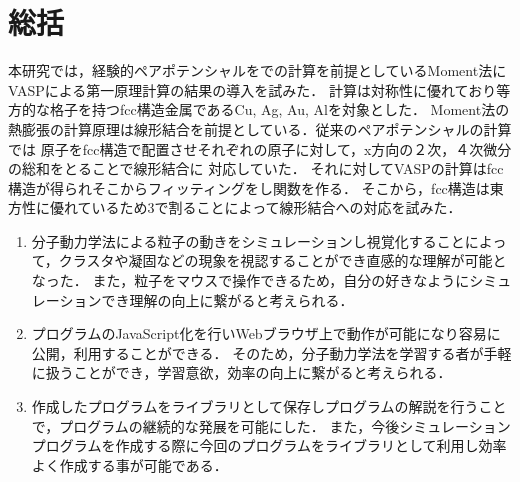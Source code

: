 \chapter{総括}
本研究では，経験的ペアポテンシャルをでの計算を前提としているMoment法にVASPによる第一原理計算の結果の導入を試みた．
計算は対称性に優れており等方的な格子を持つfcc構造金属であるCu, Ag, Au, Alを対象とした．
Moment法の熱膨張の計算原理は線形結合を前提としている．従来のペアポテンシャルの計算では
原子をfcc構造で配置させそれぞれの原子に対して，x方向の２次，４次微分の総和をとることで線形結合に
対応していた．
それに対してVASPの計算はfcc構造が得られそこからフィッティングをし関数を作る．
そこから，fcc構造は東方性に優れているため3で割ることによって線形結合への対応を試みた．





\begin{enumerate}
  \item 分子動力学法による粒子の動きをシミュレーションし視覚化することによって，クラスタや凝固などの現象を視認することができ直感的な理解が可能となった．
また，粒子をマウスで操作できるため，自分の好きなようにシミュレーションでき理解の向上に繋がると考えられる．
  \item プログラムのJavaScript化を行いWebブラウザ上で動作が可能になり容易に公開，利用することができる．
そのため，分子動力学法を学習する者が手軽に扱うことができ，学習意欲，効率の向上に繋がると考えられる．
  \item 作成したプログラムをライブラリとして保存しプログラムの解説を行うことで，プログラムの継続的な発展を可能にした．
また，今後シミュレーションプログラムを作成する際に今回のプログラムをライブラリとして利用し効率よく作成する事が可能である．
\end{enumerate}



